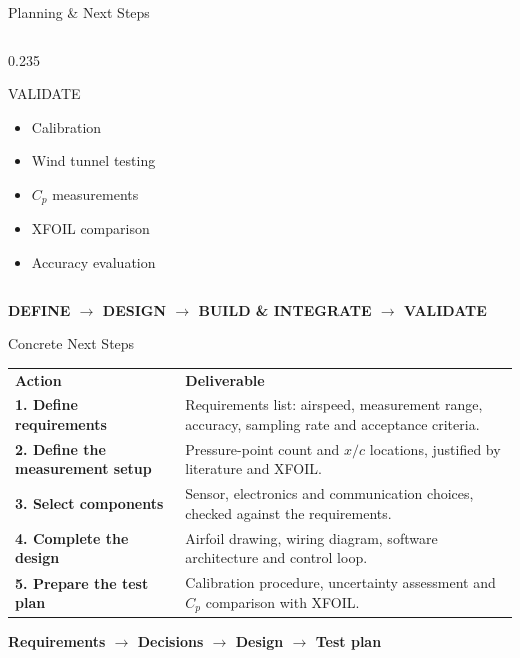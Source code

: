 \documentclass[aspectratio=169,10pt]{beamer}
\newcommand{\Cp}{\ensuremath{C_p}}
\newcommand{\xc}{\ensuremath{x/c}}
\newenvironment{points}{\begin{itemize}\setlength{\itemsep}{0.45em}}{\end{itemize}}
\begin{document}
\begin{frame}{Planning \& Next Steps}
\begin{columns}[T,onlytextwidth]
\begin{column}{0.235\textwidth}
      \begin{block}{VALIDATE}
        \begin{points}
          \item Calibration
          \item Wind tunnel testing
          \item \Cp{} measurements
          \item XFOIL comparison
          \item Accuracy evaluation
        \end{points}
      \end{block}
    \end{column}
  \end{columns}
  \vfill
  \begin{center}\color{structure.fg}\small\bfseries
    DEFINE $\longrightarrow$ DESIGN $\longrightarrow$
    BUILD \& INTEGRATE $\longrightarrow$ VALIDATE
  \end{center}
\end{frame}

\begin{frame}{Concrete Next Steps}
  \small
  \renewcommand{\arraystretch}{1.15}
  \begin{tabular}{@{}p{}@{\hspace{0.04\textwidth}}p{}@{}}
    \textcolor{structure.fg}{\textbf{Action}} &
    \textcolor{structure.fg}{\textbf{Deliverable}} \\[6pt]
    \textbf{1. Define requirements} &
    Requirements list: airspeed, measurement range, accuracy, sampling rate and acceptance criteria. \\[9pt]
    \textbf{2. Define the measurement setup} &
    Pressure-point count and \xc{} locations, justified by literature and XFOIL. \\[9pt]
    \textbf{3. Select components} &
    Sensor, electronics and communication choices, checked against the requirements. \\[9pt]
    \textbf{4. Complete the design} &
    Airfoil drawing, wiring diagram, software architecture and control loop. \\[9pt]
    \textbf{5. Prepare the test plan} &
    Calibration procedure, uncertainty assessment and \Cp{} comparison with XFOIL.
  \end{tabular}
  \vfill
  \begin{center}\color{structure.fg}\small\bfseries
    Requirements $\longrightarrow$ Decisions $\longrightarrow$ Design $\longrightarrow$ Test plan
  \end{center}
\end{frame}
\end{document}
